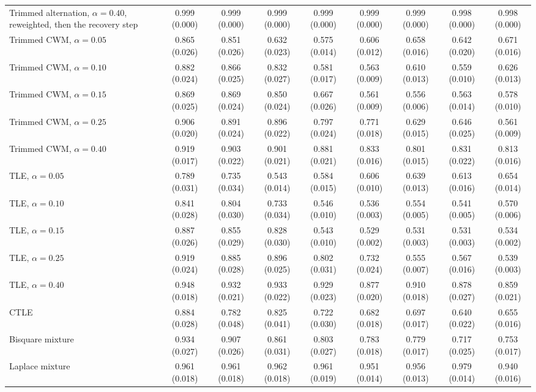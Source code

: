 \begin{table}[htbp]
{\begin{tabular}{lcccccccc}
Trimmed alternation, $\alpha=0.40$, reweighted, then the recovery step & 0.999 (0.000) & 0.999 (0.000) & 0.999 (0.000) & 0.999 (0.000) & 0.999 (0.000) & 0.999 (0.000) & 0.998 (0.000) & 0.998 (0.000) \\
Trimmed CWM, $\alpha=0.05$ & 0.865 (0.026) & 0.851 (0.026) & 0.632 (0.023) & 0.575 (0.014) & 0.606 (0.012) & 0.658 (0.016) & 0.642 (0.020) & 0.671 (0.016) \\
Trimmed CWM, $\alpha=0.10$ & 0.882 (0.024) & 0.866 (0.025) & 0.832 (0.027) & 0.581 (0.017) & 0.563 (0.009) & 0.610 (0.013) & 0.559 (0.010) & 0.626 (0.013) \\
Trimmed CWM, $\alpha=0.15$ & 0.869 (0.025) & 0.869 (0.024) & 0.850 (0.024) & 0.667 (0.026) & 0.561 (0.009) & 0.556 (0.006) & 0.563 (0.014) & 0.578 (0.010) \\
Trimmed CWM, $\alpha=0.25$ & 0.906 (0.020) & 0.891 (0.024) & 0.896 (0.022) & 0.797 (0.024) & 0.771 (0.018) & 0.629 (0.015) & 0.646 (0.025) & 0.561 (0.009) \\
Trimmed CWM, $\alpha=0.40$ & 0.919 (0.017) & 0.903 (0.022) & 0.901 (0.021) & 0.881 (0.021) & 0.833 (0.016) & 0.801 (0.015) & 0.831 (0.022) & 0.813 (0.016) \\
TLE, $\alpha=0.05$ & 0.789 (0.031) & 0.735 (0.034) & 0.543 (0.014) & 0.584 (0.015) & 0.606 (0.010) & 0.639 (0.013) & 0.613 (0.016) & 0.654 (0.014) \\
TLE, $\alpha=0.10$ & 0.841 (0.028) & 0.804 (0.030) & 0.733 (0.034) & 0.546 (0.010) & 0.536 (0.003) & 0.554 (0.005) & 0.541 (0.005) & 0.570 (0.006) \\
TLE, $\alpha=0.15$ & 0.887 (0.026) & 0.855 (0.029) & 0.828 (0.030) & 0.543 (0.010) & 0.529 (0.002) & 0.531 (0.003) & 0.531 (0.003) & 0.534 (0.002) \\
TLE, $\alpha=0.25$ & 0.919 (0.024) & 0.885 (0.028) & 0.896 (0.025) & 0.802 (0.031) & 0.732 (0.024) & 0.555 (0.007) & 0.567 (0.016) & 0.539 (0.003) \\
TLE, $\alpha=0.40$ & 0.948 (0.018) & 0.932 (0.021) & 0.933 (0.022) & 0.929 (0.023) & 0.877 (0.020) & 0.910 (0.018) & 0.878 (0.027) & 0.859 (0.021) \\
CTLE & 0.884 (0.028) & 0.782 (0.048) & 0.825 (0.041) & 0.722 (0.030) & 0.682 (0.018) & 0.697 (0.017) & 0.640 (0.022) & 0.655 (0.016) \\
Bisquare mixture & 0.934 (0.027) & 0.907 (0.026) & 0.861 (0.031) & 0.803 (0.027) & 0.783 (0.018) & 0.779 (0.017) & 0.717 (0.025) & 0.753 (0.017) \\
Laplace mixture & 0.961 (0.018) & 0.961 (0.018) & 0.962 (0.018) & 0.961 (0.019) & 0.951 (0.014) & 0.956 (0.013) & 0.979 (0.014) & 0.940 (0.016) \\

\end{tabular}}
\end{table}
